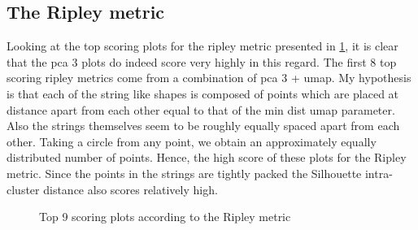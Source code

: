\documentclass[11pt]{article}
\begin{document}
\subsection{The Ripley metric}

Looking at the top scoring plots for the ripley metric presented in \ref{fig:top_ripley}, it is clear that the pca 3 plots do indeed score very highly in this regard. The first 8 top scoring ripley metrics come from a combination of pca 3 + umap. My hypothesis is that each of the string like shapes is composed of points which are placed at distance apart from each other equal to that of the min dist umap parameter. Also the strings themselves seem to be roughly equally spaced apart from each other. Taking a circle from any point, we obtain an approximately equally distributed number of points. Hence, the high score of these plots for the Ripley metric. Since the points in the strings are tightly packed the Silhouette intra-cluster distance also scores relatively high.

\begin{figure}[htbp]
\centering
{}
\caption{Top 9 scoring plots according to the Ripley metric}
\label{fig:top_ripley}
\end{figure}
\end{document}
